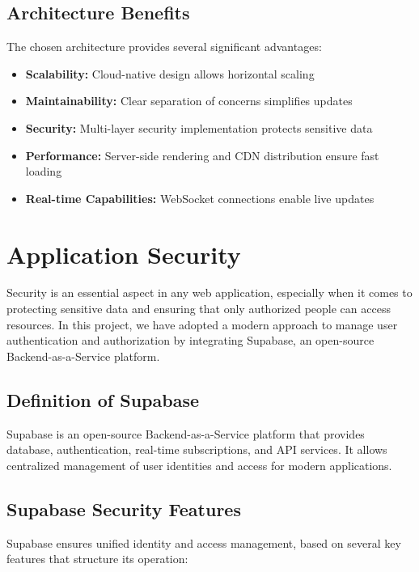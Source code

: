 \subsection{Architecture Benefits}
The chosen architecture provides several significant advantages:

\begin{itemize}
\item \textbf{Scalability:} Cloud-native design allows horizontal scaling
\item \textbf{Maintainability:} Clear separation of concerns simplifies updates
\item \textbf{Security:} Multi-layer security implementation protects sensitive data
\item \textbf{Performance:} Server-side rendering and CDN distribution ensure fast loading
\item \textbf{Real-time Capabilities:} WebSocket connections enable live updates
\end{itemize}

\section{Application Security}
Security is an essential aspect in any web application, especially when it comes to protecting sensitive data and ensuring that only authorized people can access resources. In this project, we have adopted a modern approach to manage user authentication and authorization by integrating Supabase, an open-source Backend-as-a-Service platform.

\subsection{Definition of Supabase}
Supabase is an open-source Backend-as-a-Service platform that provides database, authentication, real-time subscriptions, and API services. It allows centralized management of user identities and access for modern applications.

\subsection{Supabase Security Features}
Supabase ensures unified identity and access management, based on several key features that structure its operation:

\vspace{0.5cm}

